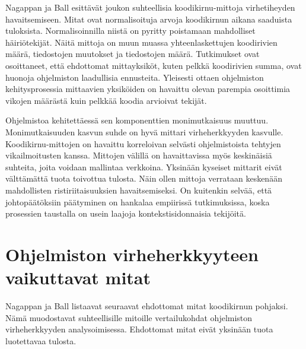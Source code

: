 \documentclass[finnish]{../tktltiki2}
\theoremstyle{definition}
\theoremstyle{remark}
\begin{document}
    Nagappan ja Ball esittävät joukon suhteellisia koodikirnu-mittoja virhetiheyden havaitsemiseen. Mitat ovat 
normalisoituja arvoja koodikirnun aikana saaduista tuloksista. Normalisoinnilla niistä on pyritty poistamaan mahdolliset 
häiriötekijät. Näitä mittoja on muun muassa yhteenlaskettujen koodirivien määrä, tiedostojen muutokset ja tiedostojen 
määrä. Tutkimukset ovat osoittaneet, että ehdottomat mittayksiköt, kuten pelkkä koodirivien summa, ovat huonoja ohjelmiston 
laadullisia ennusteita. Yleisesti ottaen ohjelmiston kehitysprosessia mittaavien yksiköiden on havaittu olevan parempia
osoittimia vikojen määrästä kuin pelkkää koodia arvioivat tekijät.

    Ohjelmistoa kehitettäessä sen komponenttien monimutkaisuus muuttuu. Monimutkaisuuden kasvun suhde on hyvä mittari 
virheherkkyyden kasvulle. Koodikirnu-mittojen on havaittu korreloivan selvästi ohjelmistoista tehtyjen vikailmoitusten 
kanssa. Mittojen välillä on havaittavissa myös keskinäisiä suhteita, joita voidaan mallintaa verkkoina. Yksinään 
kyseiset mittarit eivät välttämättä tuota toivottua tulosta. Näin ollen mittoja verrataan keskenään mahdollisten 
ristiriitaisuuksien havaitsemiseksi. On kuitenkin selvää, että johtopäätöksiin päätyminen on hankalaa empiirissä 
tutkimuksissa, koska prosessien taustalla on usein laajoja kontekstisidonnaisia tekijöitä.

\section{Ohjelmiston virheherkkyyteen vaikuttavat mitat}

Nagappan ja Ball listaavat seuraavat ehdottomat mitat koodikirnun pohjaksi. Nämä muodostavat suhteellisille mitoille 
vertailukohdat ohjelmiston virheherkkyyden analysoimisessa. Ehdottomat mitat eivät yksinään tuota luotettavaa tulosta.
\end{document}

